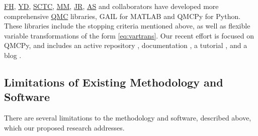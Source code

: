 \documentclass[11pt]{NSFamsart}
\newcommand{\FH}{\hyperlink{FHlink}{FH}\xspace}
\newcommand{\SCTC}{\hyperlink{SCTClink}{SCTC}\xspace}
\newcommand{\MM}{\hyperlink{MMlink}{MM}\xspace}
\newcommand{\YD}{\hyperlink{YDlink}{YD}\xspace}
\newcommand{\JR}{\hyperlink{JRlink}{JR}\xspace}
\newcommand{\AS}{\hyperlink{ASlink}{AS}\xspace}
\newcommand{\QMC}{\hyperlink{QMClink}{QMC}\xspace}
\newcommand{\QMCPy}{QMCPy\xspace}
\newcommand{\MATLAB}{MATLAB\xspace}
\begin{document}
\FH, \YD, \SCTC, \MM, \JR, \AS and collaborators have developed more comprehensive \QMC libraries, GAIL \cite{ChoEtal21a} for \MATLAB and \QMCPy \cite{QMCPy2020a} for Python.  These libraries include the stopping criteria mentioned above, as well as flexible variable transformations of the form \eqref{eq:vartrans}.  Our recent effort is focused on \QMCPy, and includes an active repository \cite{QMCPy2020a}, documentation \cite{QMCPyDocs}, a tutorial \cite{QMCPyTutMovie2020}, and a blog \cite{QMCBlog}.


\subsection{Limitations of Existing Methodology and Software} \label{sec:limit}

There are several limitations to the methodology and software, described above, which our proposed research addresses.
\end{document}
